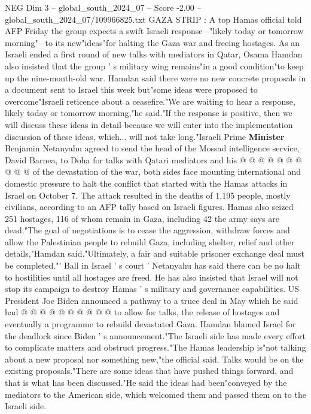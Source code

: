 \begin{textsample}{NEG Dim 3 – global\_south\_2024\_07 – Score -2.00 – global\_south\_2024\_07/109966825.txt}  \label{ex:f3_neg_141}
GAZA STRIP : A top Hamas official told AFP Friday the group expects a swift Israeli response --"likely today or tomorrow morning"-- to its new"ideas"for halting the Gaza war and freeing hostages.
As an Israeli ended a first round of new talks with mediators in Qatar, Osama Hamdan also insisted that the group ' s military wing remains"in a good condition"to keep up the nine-month-old war.
Hamdan said there were no new concrete proposals in a document sent to Israel this week but"some ideas were proposed to overcome"Israeli reticence about a ceasefire."We are waiting to hear a response, likely today or tomorrow morning,"he said."If the response is positive, then we will discuss these ideas in detail because we will enter into the implementation discussion of these ideas, which... will not take long."Israeli Prime \textbf{Minister} Benjamin Netanyahu agreed to send the head of the Mossad intelligence service, David Barnea, to Doha for talks with Qatari mediators and his @ @ @ @ @ @ @ @ @ @ of the devastation of the war, both sides face mounting international and domestic pressure to halt the conflict that started with the Hamas attacks in Israel on October 7.
The attack resulted in the deaths of 1,195 people, mostly civilians, according to an AFP tally based on Israeli figures.
Hamas also seized 251 hostages, 116 of whom remain in Gaza, including 42 the army says are dead."The goal of negotiations is to cease the aggression, withdraw forces and allow the Palestinian people to rebuild Gaza, including shelter, relief and other details,"Hamdan said."Ultimately, a fair and suitable prisoner exchange deal must be completed."' Ball in Israel ' s court ' Netanyahu has said there can be no halt to hostilities until all hostages are freed.
He has also insisted that Israel will not stop its campaign to destroy Hamas ' s military and governance capabilities.
US President Joe Biden announced a pathway to a truce deal in May which he said had @ @ @ @ @ @ @ @ @ @ to allow for talks, the release of hostages and eventually a programme to rebuild devastated Gaza.
Hamdan blamed Israel for the deadlock since Biden ' s announcement."The Israeli side has made every effort to complicate matters and obstruct progress."The Hamas leadership is"not talking about a new proposal nor something new,"the official said.
Talks would be on the existing proposals."There are some ideas that have pushed things forward, and that is what has been discussed."He said the ideas had been"conveyed by the mediators to the American side, which welcomed them and passed them on to the Israeli side.

\end{textsample}
